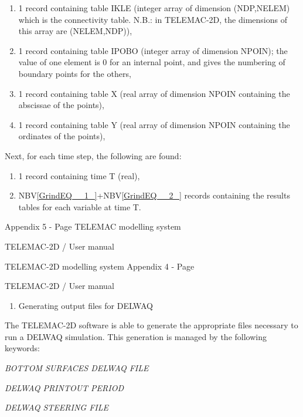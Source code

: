 \begin{enumerate}
\item  1 record containing table IKLE (integer array of dimension (NDP,NELEM) which is the connectivity table. N.B.: in TELEMAC-2D, the dimensions of this array are (NELEM,NDP)),

\item  1 record containing table IPOBO (integer array of dimension NPOIN); the value of one element is 0 for an internal point, and gives the numbering of boundary points for the others,

\item  1 record containing table X (real array of dimension NPOIN containing the abscissae of the points),

\item  1 record containing table Y (real array of dimension NPOIN containing the ordinates of the points),
\end{enumerate}

 Next, for each time step, the following are found:

\begin{enumerate}
\item  1 record containing time T (real),

\item  NBV\eqref{GrindEQ__1_}+NBV\eqref{GrindEQ__2_} records containing the results tables for each variable at time T.
\end{enumerate}

 Appendix 5 - Page   TELEMAC modelling system

 TELEMAC-2D / User manual



 TELEMAC-2D modelling system Appendix 4 - Page

 TELEMAC-2D / User manual



\begin{enumerate}
\item   Generating output files for DELWAQ
\end{enumerate}



 The TELEMAC-2D software is able to generate the appropriate files necessary to run a DELWAQ simulation. This generation is managed by the following keywords:



 \textit{BOTTOM SURFACES DELWAQ FILE}

 \textit{DELWAQ PRINTOUT PERIOD}

 \textit{DELWAQ STEERING FILE}

